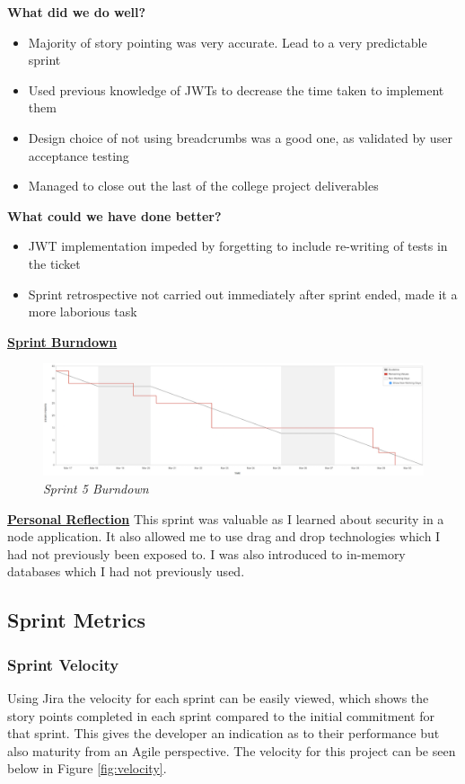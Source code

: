 \textbf{What did we do well?}
\begin{itemize}
	\item Majority of story pointing was very accurate. Lead to a very predictable sprint
	\item Used previous knowledge of JWTs to decrease the time taken to implement them
	\item Design choice of not using breadcrumbs was a good one, as validated by user acceptance testing
	\item Managed to close out the last of the college project deliverables
\end{itemize}
\textbf{What could we have done better?}
\begin{itemize}
	\item JWT implementation impeded by forgetting to include re-writing of tests in the ticket
	\item Sprint retrospective not carried out immediately after sprint ended, made it a more laborious task
\end{itemize}
\clearpage
\underline{\textbf{Sprint Burndown}}\newline
\begin{figure}[!ht]
\centering
\includegraphics*[width=\textwidth]{images/sprint5}
\caption{\em Sprint 5 Burndown}
\label{fig:sprint5}
\end{figure}

\underline{\textbf{Personal Reflection}}\newline
This sprint was valuable as I learned about security in a node application. It also allowed me to use drag and drop technologies which I had not previously been exposed to. I was also introduced to in-memory databases which I had not previously used.

\subsection{Sprint Metrics}

\subsubsection{Sprint Velocity}
Using Jira the velocity for each sprint can be easily viewed, which shows the story points completed in each sprint compared to the initial commitment for that sprint. This gives the developer an indication as to their performance but also maturity from an Agile perspective. The velocity for this project can be seen below in Figure \ref{fig:velocity}.

